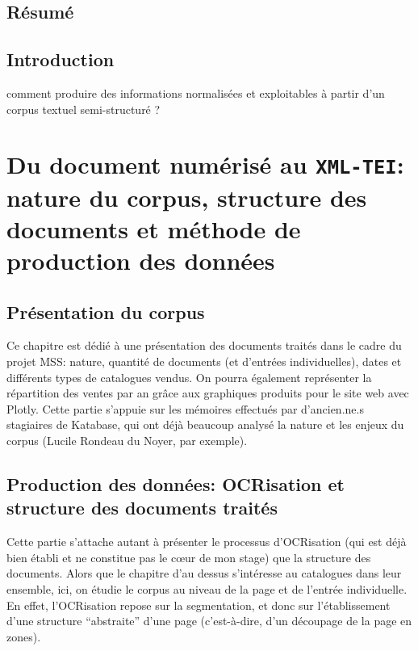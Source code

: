 \documentclass[a4paper, 12pt, twoside]{book}
\newcommand{\xmltei}{\texttt{XML-TEI}}
\begin{document}
\onehalfspacing

\begin{titlepage}
 
\end{titlepage}

\frontmatter
\chapter*{Résumé}

\mainmatter
\chapter*{Introduction}
comment produire des informations normalisées et exploitables à partir d'un corpus textuel semi-structuré ?





\part{Du document numérisé au \xmltei: nature du corpus, structure des documents et méthode de production des données}
\chapter{Présentation du corpus}
Ce chapitre est dédié à une présentation des documents traités dans le cadre du projet MSS: nature, quantité de documents (et d'entrées individuelles), dates et différents types de catalogues vendus. On pourra également représenter la répartition des ventes par an grâce aux graphiques produits pour le site web avec Plotly. Cette partie s'appuie sur les mémoires effectués par d'ancien.ne.s stagiaires de Katabase, qui ont déjà beaucoup analysé la nature et les enjeux du corpus (Lucile Rondeau du Noyer, par exemple).

\chapter{Production des données: OCRisation et structure des documents traités}
Cette partie s'attache autant à présenter le processus d'OCRisation (qui est déjà bien établi et ne constitue pas le cœur de mon stage) que la structure des documents. Alors que le chapitre d'au dessus s'intéresse au catalogues dans leur ensemble, ici, on étudie le corpus au niveau de la page et de l'entrée individuelle. En effet, l'OCRisation repose sur la segmentation, et donc sur l'établissement d'une structure \enquote{abstraite} d'une page (c'est-à-dire, d'un découpage de la page en zones).
\end{document}
